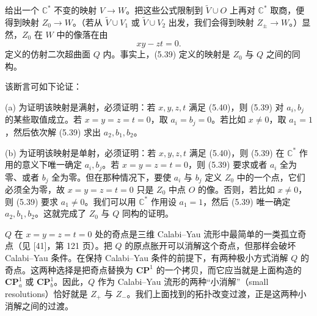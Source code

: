 \label{op:70}
给出一个 $\mathbb{C}^{*}$ 不变的映射 $V\to W$。把这些公式限制到 $\tilde V\cup O$ 上再对 $\mathbb{C}^{*}$ 取商，便得到映射 $Z_{0}\to W$。（若从 $\tilde V\cup V_{1}$ 或 $\tilde V\cup V_{2}$ 出发，我们会得到映射 $Z_{\pm}\to W$。）显然，$Z_{0}$ 在 $W$ 中的像落在由
\begin{equation}
\tag{5.40}
xy-zt=0.
\end{equation}
定义的仿射二次超曲面 $Q$ 内。事实上，(5.39) 定义的映射是 $Z_{0}$ 与 $Q$ 之间的同构。


该断言可如下论证：

(a) 为证明该映射是满射，必须证明：若 $x,y,z,t$ 满足 (5.40)，则 (5.39) 对 $a_{i},b_{j}$ 的某些取值成立。若 $x=y=z=t=0$，取 $a_{i}=b_{j}=0$。若比如 $x\neq0$，取 $a_{1}=1$，然后依次解 (5.39) 求出 $a_{2},b_{1},b_{2}$。

(b) 为证明该映射是单射，必须证明：若 $x,y,z,t$ 满足 (5.40)，则 (5.39) 在 $\mathbb{C}^{*}$ 作用的意义下唯一确定 $a_{i},b_{j}$。若 $x=y=z=t=0$，则 (5.39) 要求或者 $a_{i}$ 全为零、或者 $b_{j}$ 全为零。但在那种情况下，要使 $a_{i}$ 与 $b_{j}$ 定义 $Z_{0}$ 中的一个点，它们必须全为零，故 $x=y=z=t=0$ 只是 $Z_{0}$ 中点 $O$ 的像。否则，若比如 $x\neq0$，则 (5.39) 要求 $a_{1}\neq0$。我们可以用 $\mathbb{C}^{*}$ 作用设 $a_{1}=1$，然后 (5.39) 唯一确定 $a_{2},b_{1},b_{2}$。这就完成了 $Z_{0}$ 与 $Q$ 同构的证明。

$Q$ 在 $x=y=z=t=0$ 处的奇点是三维 Calabi--Yau 流形中最简单的一类孤立奇点（见 [41]，第 121 页）。把 $Q$ 的原点胀开可以消解这个奇点，但那样会破坏 Calabi--Yau 条件。在保持 Calabi--Yau 条件的前提下，有两种极小方式消解 $Q$ 的奇点。这两种选择是把奇点替换为 $\mathbf{CP}^{1}$ 的一个拷贝，而它应当就是上面构造的 $\mathbf{CP}^{1}_{a}$ 或 $\mathbf{CP}^{1}_{b}$。因此，$Q$ 作为 Calabi--Yau 流形的两种“小消解”（small resolutions）恰好就是 $Z_{+}$ 与 $Z_{-}$。我们上面找到的拓扑改变过渡，正是这两种小消解之间的过渡。


